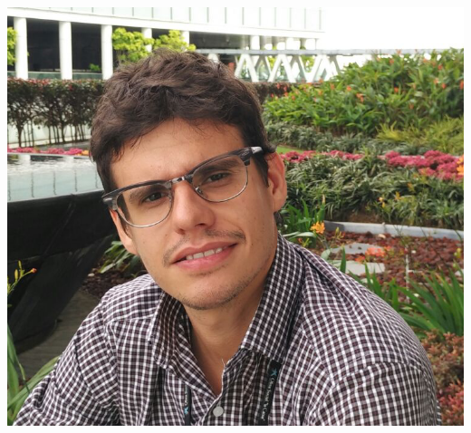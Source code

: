 \documentclass[paper=a4,fontsize=11pt]{temp} %
\begin{document}
\sepspace
\begin{minipage}{.2\linewidth}
   \includegraphics[width=\textwidth]{fotoCV5}
\end{minipage}      
\end{document}
